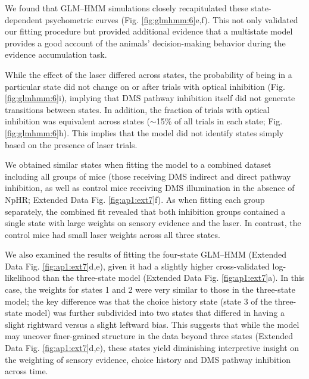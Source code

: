 We found that GLM–HMM simulations closely recapitulated these state-dependent psychometric curves (Fig. \ref{fig:glmhmm:6}e,f). This not only validated our fitting procedure but provided additional evidence that a multistate model provides a good account of the animals’ decision-making behavior during the evidence accumulation task.

While the effect of the laser differed across states, the probability of being in a particular state did not change on or after trials with optical inhibition (Fig. \ref{fig:glmhmm:6}i), implying that DMS pathway inhibition itself did not generate transitions between states. In addition, the fraction of trials with optical inhibition was equivalent across states ($\sim$15\% of all trials in each state; Fig. \ref{fig:glmhmm:6}h). This implies that the model did not identify states simply based on the presence of laser trials.

We obtained similar states when fitting the model to a combined dataset including all groups of mice (those receiving DMS indirect and direct pathway inhibition, as well as control mice receiving DMS illumination in the absence of NpHR; Extended Data Fig. \ref{fig:ap1:ext7}f). As when fitting each group separately, the combined fit revealed that both inhibition groups contained a single state with large weights on sensory evidence and the laser. In contrast, the control mice had small laser weights across all three states.

We also examined the results of fitting the four-state GLM–HMM (Extended Data Fig. \ref{fig:ap1:ext7}d,e), given it had a slightly higher cross-validated log-likelihood than the three-state model (Extended Data Fig. \ref{fig:ap1:ext7}a). In this case, the weights for states 1 and 2 were very similar to those in the three-state model; the key difference was that the choice history state (state 3 of the three-state model) was further subdivided into two states that differed in having a slight rightward versus a slight leftward bias. This suggests that while the model may uncover finer-grained structure in the data beyond three states (Extended Data Fig. \ref{fig:ap1:ext7}d,e), these states yield diminishing interpretive insight on the weighting of sensory evidence, choice history and DMS pathway inhibition across time.